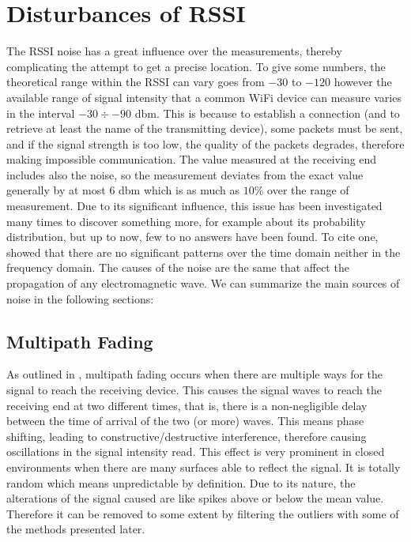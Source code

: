 \documentclass[12pt]{report}
\begin{document}
\chapter{Disturbances of RSSI}
The RSSI noise has a great influence over the measurements, thereby complicating the attempt to get a precise location. To give some numbers, the theoretical range within the RSSI can vary goes from $-30$ to $-120$ however the available range of signal intensity that a common WiFi device can measure varies in the interval $-30\div-90$ dbm. This is because to establish a connection (and to retrieve at least the name of the transmitting device), some packets must be sent, and if the signal strength is too low, the quality of the packets degrades, therefore making impossible communication. The value measured at the receiving end includes also the noise, so the measurement deviates from the exact value generally by at most $6$ dbm which is as much as $10\%$ over the range of measurement.
Due to its significant influence, this issue has been investigated many times to discover something more, for example about its probability distribution, but up to now, few to no answers have been found. To cite one, \cite{4608603} showed that there are no significant patterns over the time domain neither in the frequency domain. The causes of the noise are the same that affect the propagation of any electromagnetic wave. We can summarize the main sources of noise in the following sections: 
\section{Multipath Fading} 
As outlined in \cite{onl11}, multipath fading occurs when there are multiple ways for the signal to reach the receiving device. This causes the signal waves to reach the receiving end at two different times, that is, there is a non-negligible delay between the time of arrival of the two (or more) waves. This means phase shifting, leading to constructive/destructive interference, therefore causing oscillations in the signal intensity read. This effect is very prominent in closed environments when there are many surfaces able to reflect the signal. It is totally random \cite{10.5555/559977} which means unpredictable by definition. Due to its nature, the alterations of the signal caused are like spikes above or below the mean value. Therefore it can be removed to some extent by filtering the outliers with some of the methods presented later.
\end{document}
